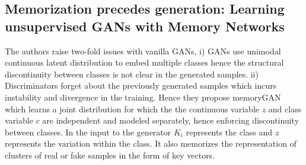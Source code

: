 \subsection*{Memorization precedes generation: Learning unsupervised GANs with Memory Networks \citep{memory}}
The authors raise two-fold issues with vanilla GANs, i)  GANs use unimodal continuous latent distribution to embed multiple classes hence the structural discontinuity between classes is not clear in the generated samples. ii) Discriminators forget about the previously generated samples which incurs instability and divergence in the training. Hence they propose memoryGAN which learns a joint distribution for which the the continuous variable $z$ and class variable $c$ are independent and modeled separately, hence enforcing discontinuity between classes. In the input to the generator $K_i$ represents the class and $z$ represents the variation within the class. It also memorizes the representation of clusters of real or fake samples in the form of key vectors.

